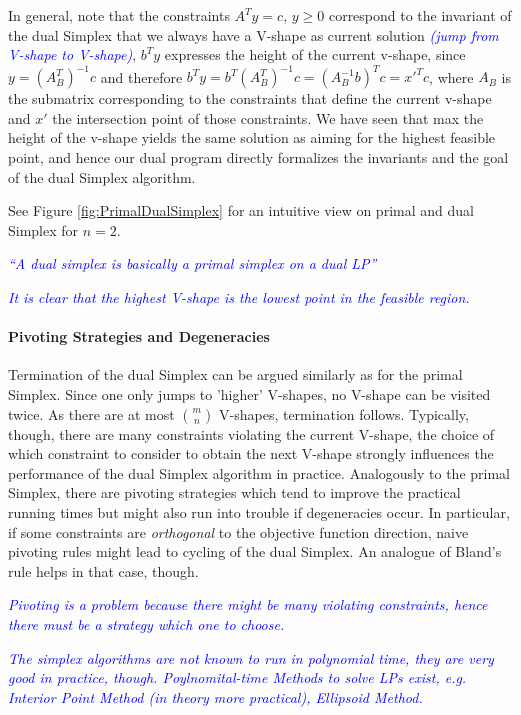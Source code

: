 \documentclass{article}
\begin{document}
In general, note that the constraints $A^Ty=c$, $y\geq 0$ correspond to the invariant of the dual Simplex that we always have a V-shape as current solution \textcolor{blue}{\emph{(jump from V-shape to V-shape)}}, $b^Ty$ expresses the height of the current v-shape, since $y=(A_B^T)^{-1}c$ and therefore $b^Ty=b^T(A_B^T)^{-1}c=(A_B^{-1}b)^Tc = x'^T c$, where $A_B$ is the submatrix corresponding to the constraints that define the current v-shape and $x'$ the intersection point of those constraints. We have seen that max the height of the v-shape yields the same solution as aiming for the highest feasible point, and hence our dual program directly formalizes the invariants and the goal of the dual Simplex algorithm.

See Figure \ref{fig:PrimalDualSimplex} for an intuitive view on primal and dual Simplex for $n=2$.

\textcolor{blue}{\emph{``A dual simplex is basically a primal simplex on a dual LP'' }}
 
\textcolor{blue}{\emph{It is clear that the highest V-shape is the lowest point in the feasible region.}}

\paragraph{Pivoting Strategies and Degeneracies}
Termination of the dual Simplex can be argued similarly as for the primal Simplex. Since one only jumps to 'higher' V-shapes, no V-shape can be visited twice. As there are at most $m \choose n$ V-shapes, termination follows. Typically, though, there are many constraints violating the current V-shape, the choice of which constraint to consider to obtain the next V-shape strongly influences the performance of the dual Simplex algorithm in practice. Analogously to the primal Simplex, there are pivoting strategies which tend to improve the practical running times but might also run into trouble if degeneracies occur. In particular, if some constraints are \emph{orthogonal} to the objective function direction, naive pivoting rules might lead to cycling of the dual Simplex. An analogue of Bland's rule helps in that case, though.

 
\textcolor{blue}{\emph{Pivoting is a problem because there might be many violating constraints, hence there must be a strategy which one to choose.}}

\textcolor{blue}{\emph{The simplex algorithms are not known to run in polynomial time, they are very good in practice, though. Poylnomital-time Methods to solve LPs exist, e.g. Interior Point Method (in theory more practical), Ellipsoid Method.}}
\end{document}
